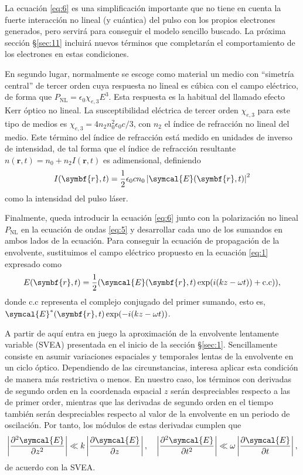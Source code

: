 \documentclass{scrartcl} %
\newcommand*{\pdv}[2]{\frac{\partial#1}{\partial#2}}
\newcommand*{\pdvN}[3]{\frac{\partial^{#3}#1}{\partial{#2}^{#3}}}
\newcommand*{\abs}[1]{\left|#1\right|}
\begin{document}
La ecuación \eqref{eq:6} es una simplificación importante que no tiene en cuenta la fuerte interacción no lineal (y cuántica) del pulso con los propios electrones generados, pero servirá para conseguir el modelo sencillo buscado. La próxima sección \S\ref{sec:11} incluirá nuevos términos que completarán el comportamiento de los electrones en estas condiciones.

En segundo lugar, normalmente se escoge como material un medio con \enquote{simetría central} de tercer orden cuya respuesta no lineal es cúbica con el campo eléctrico, de forma que $P_{\mathrm{NL}} = \epsilon_{0} \chi_{e,3} E^{3}$. Esta respuesta es la habitual del llamado efecto Kerr óptico no lineal. La susceptibilidad eléctrica de tercer orden $\chi_{e,3}$ para este tipo de medios es $\chi_{e,3} = 4 n_{2}n_{0}^{2}\epsilon_{0} c / 3$, con $n_{2}$ el índice de refracción no lineal del medio\cite{Couairon2007}. Este término del índice de refracción está medido en unidades de inverso de intensidad, de tal forma que el índice de refracción resultante $n(\symbf{r},t) = n_{0} + n_{2}I(\symbf{r},t)$ es adimensional, definiendo
\begin{equation}\label{eq:7}
  I(\symbf{r},t) = \frac{1}{2} \epsilon_{0} c n_{0} \abs{\symcal{E}(\symbf{r},t)}^{2}
\end{equation} 
como la intensidad del pulso láser.

Finalmente, queda introducir la ecuación \eqref{eq:6} junto con la polarización no lineal $P_{\mathrm{NL}}$ en la ecuación de ondas \eqref{eq:5} y desarrollar cada uno de los sumandos en ambos lados de la ecuación. Para conseguir la ecuación de propagación de la envolvente, sustituimos el campo eléctrico propuesto en la ecuación \eqref{eq:1} expresado como 
\begin{equation}\label{eq:8}
  E(\symbf{r},t) = \frac{1}{2}(\symcal{E}(\symbf{r},t)\exp(i(kz - \omega t)) + \mathrm{c.c})),
\end{equation}
donde $\mathrm{c.c}$ representa el complejo conjugado del primer sumando, esto es, $\symcal{E}^{*}(\symbf{r},t)\exp(-i(kz - \omega t))$. 

A partir de aquí entra en juego la aproximación de la envolvente lentamente variable (SVEA) \cite{Milonni2010} presentada en el inicio de la sección \S\ref{sec:1}. Sencillamente consiste en asumir variaciones espaciales y temporales lentas de la envolvente en un ciclo óptico. Dependiendo de las circunstancias, interesa aplicar esta condición de manera más restrictiva o menos. En nuestro caso, los términos con derivadas de segundo orden en la coordenada espacial $z$ serán despreciables respecto a las de primer order, mientras que las derivadas de segundo orden en el tiempo también serán despreciables respecto al valor de la envolvente en un periodo de oscilación. Por tanto, los módulos de estas derivadas cumplen que
\begin{equation}\label{eq:9}
  \abs{\pdvN{\symcal{E}}{z}{2}} \ll k\abs{\pdv{\symcal{E}}{z}}, \quad \abs{\pdvN{\symcal{E}}{t}{2}} \ll \omega\abs{\pdv{\symcal{E}}{t}},
\end{equation}
de acuerdo con la SVEA.
\end{document}
